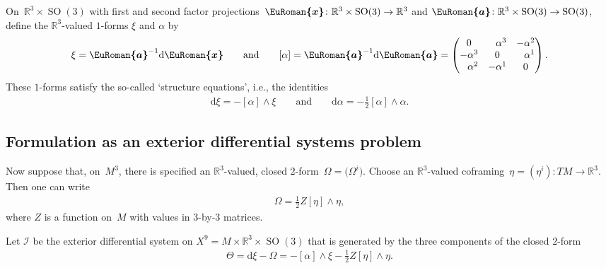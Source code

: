 \documentclass[pdftex]{sigma}
\numberwithin{equation}{section}
\newcommand{\eurom}{\EuRoman}
\renewcommand{\d}{\mathrm{d}}%
\newcommand{\cI}{{\mathcal I}}
\newcommand{\bbR}{{\mathbb R}}
\newcommand{\SO}{\operatorname{SO}}
\newcommand{\euroa}{\bm{\eurom{a}}}
\newcommand{\eurox}{\bm{\eurom{x}}}
\newcommand{\phm}{\phantom{-}}
\begin{document}
On~$\bbR^3\times\SO(3)$ with first and second factor projections~$\eurox\colon \bbR^3\times\SO(3)\to\bbR^3$ and $\euroa\colon \bbR^3\times\SO(3)\to\SO(3)$,
define the $\mathbb{R}^3$-valued $1$-forms $\xi$ and $\alpha$ by
\begin{gather} \label{basis-forms-on-R3xSO3}
\xi = \euroa^{-1} \d \eurox
\qquad\text{and}\qquad
[\alpha] = \euroa^{-1} \d \euroa = \begin{pmatrix}
0 & \phm\alpha^3 & -\alpha^2\\
-\alpha^3 & 0 & \phm\alpha^1\\
\phm\alpha^2 & -\alpha^1 & 0
\end{pmatrix}.
\end{gather}
These $1$-forms satisfy the so-called `structure equations', i.e., the identities
\begin{gather} \label{structure-eqs-on-R3xSO3}
\d\xi = -[\alpha]\wedge\xi
\qquad\text{and}\qquad
\d\alpha = -\tfrac12 [\alpha]\wedge\alpha.
\end{gather}

\subsection{Formulation as an exterior differential systems problem}
Now suppose that, on~$M^3$, there is specified an $\mathbb{R}^3$-valued, closed $2$-form~$\Omega=\big(\Omega^i\big)$. Choose an $\mathbb{R}^3$-valued coframing~$\eta = (\eta^i)\colon TM\to\bbR^3$.
Then one can write
\begin{gather*}
\Omega = \tfrac12 Z [\eta]\wedge\eta ,
\end{gather*}
where $Z$ is a function on~$M$ with values in $3$-by-$3$ matrices.

Let $\cI$ be the exterior differential system on $X^9 = M\times\mathbb{R}^3\times\SO(3)$ that is generated by the three components of the closed $2$-form
\begin{gather*}%
\Theta = \d\xi - \Omega = -[\alpha]\wedge\xi - \tfrac12 Z [\eta]\wedge\eta.
\end{gather*}
\end{document}
